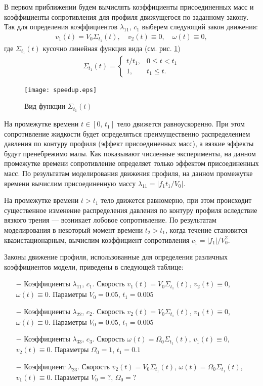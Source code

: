 В первом приближении будем вычислять коэффициенты присоединенных масс и коэффициенты сопротивления для профиля движущегося по заданному закону.
Так для определения коэффициентов $\lambda_{11}$, $c_1$ выберем следующий закон движения:
\begin{gather}
v_1(t) = V_0 \Sigma_{t_1}(t),\quad v_2(t) \equiv 0,\quad \omega(t) \equiv 0,
\end{gather}
где $\Sigma_{t_1}(t)$ кусочно линейная функция вида (см. рис. \ref{fig.sigma})
\begin{gather}
\Sigma_{t_1}(t) = \begin{cases}
t / t_1, & 0 \leqslant t < t_1\\
1, & t_1 \leqslant t.
\end{cases}
\end{gather}

\begin{figure}[ht!]
	\centering
	\texttt{[image: speedup.eps]}
	\caption{Вид функции $\Sigma_{t_1}(t)$}\label{fig.sigma}
\end{figure}

На промежутке времени $t \in [0,\, t_1]$ тело движется равноускоренно. При этом сопротивление жидкости будет определяться преимущественно распределением давления по контуру профиля (эффект присоединенных масс), а вязкие эффекты будут пренебрежимо малы. Как показывают численные эксперименты, на данном промежутке времени сопротивление определяет только эффектом присоединенных масс. По результатам моделирования движения профиля, на данном промежутке времени вычислим присоединенную массу $\lambda_{11} = |f_1 t_1 / V_0|$.

На промежутке времени $t > t_1$ тело движется равномерно, при этом происходит существенное изменение распределения давления по контуру профиля вследствие вязкого трения --- возникает лобовое сопротивление. По результатам моделирования в некоторый момент времени $t_2 > t_1$, когда течение становится квазистационарным, вычислим коэффициент сопротивления $c_1 = |f_1| / V_0^2$.

Законы движение профиля, использованные для определения различных коэффициентов модели, приведены в следующей таблице:
\begin{itemize}
	\item[$-$] Коэффициенты $\lambda_{11}$, $c_1$. Скорость $v_1(t) = V_0 \Sigma_{t_1}(t)$, $v_2(t) \equiv 0$, $\omega(t) \equiv 0$. Параметры $V_0 = 0.05$, $t_1 = 0.005$
	\item[$-$] Коэффициенты $\lambda_{22}$, $c_2$. Скорость $v_2(t) = V_0 \Sigma_{t_1}(t)$, $v_1(t) \equiv 0$, $\omega(t) \equiv 0$. Параметры $V_0 = 0.05$, $t_1 = 0.005$
	\item[$-$] Коэффициенты $\lambda_{33}$, $c_3$. Скорость $\omega(t) = \Omega_0 \Sigma_{t_1}(t)$, $v_1(t) \equiv 0$, $v_2(t) \equiv 0$. Параметры $\Omega_0 = 1$, $t_1 = 0.1$
	\item[$-$] Коэффициент $\lambda_{23}$. Скорость $v_2(t) = V_0 \Sigma_{t_1}(t)$, $\omega(t) = \Omega_0 \Sigma_{t_1}(t)$, $v_1(t) \equiv 0$. Параметры $V_0 = ?$, $\Omega_0 = ?$
\end{itemize}

